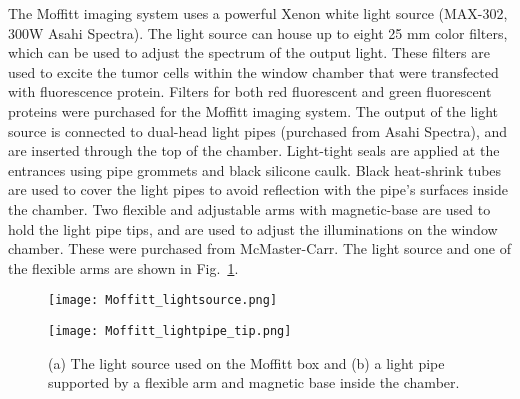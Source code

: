 The Moffitt imaging system uses a powerful Xenon white light source (MAX-302, 300W Asahi Spectra).  The light source can house up to eight 25 mm color filters, which can be used to adjust the spectrum of the output light.  These filters are used to excite the tumor cells within the window chamber that were transfected with fluorescence protein.  Filters for both red fluorescent and green fluorescent proteins were purchased for the Moffitt imaging system.  The output of the light source is connected to dual-head light pipes (purchased from Asahi Spectra), and are inserted through the top of the chamber.  Light-tight seals are applied at the entrances using pipe grommets and black silicone caulk.  Black heat-shrink tubes are used to cover the light pipes to avoid reflection with the pipe's surfaces inside the chamber.  Two flexible and adjustable arms with magnetic-base are used to hold the light pipe tips, and are used to adjust the illuminations on the window chamber.  These were purchased from McMaster-Carr.  The light source and one of the flexible arms are shown in Fig.~\ref{fig:lightsource_arm}.

\begin{figure}
	\begin{minipage}{0.4\linewidth}
	\centering
	\texttt{[image: Moffitt\_lightsource.png]}
	\subcaption{}
	\end{minipage}
%
	\begin{minipage}{0.4\linewidth}
	\centering
		\texttt{[image: Moffitt\_lightpipe\_tip.png]}
		\subcaption{}
	\end{minipage}
\caption{(a) The light source used on the Moffitt box and (b) a light pipe supported by a flexible arm and magnetic base inside the chamber.}
\label{fig:lightsource_arm}
\end{figure}

